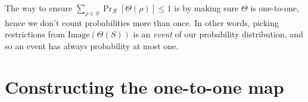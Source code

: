 
The way to ensure
$\sum_{\rho \in S} \Pr_{\mathcal{R}}[\Theta(\rho)] \leq 1
$
is by making sure \( \Theta \) is one-to-one, 
hence we don't count probabilities more than once.
In other words, picking restrictions from \(\text{Image}(\Theta(S))\) is an \emph{event} of our probability distribution, and so an event has always probability at most one.

\section*{Constructing the one-to-one map}


